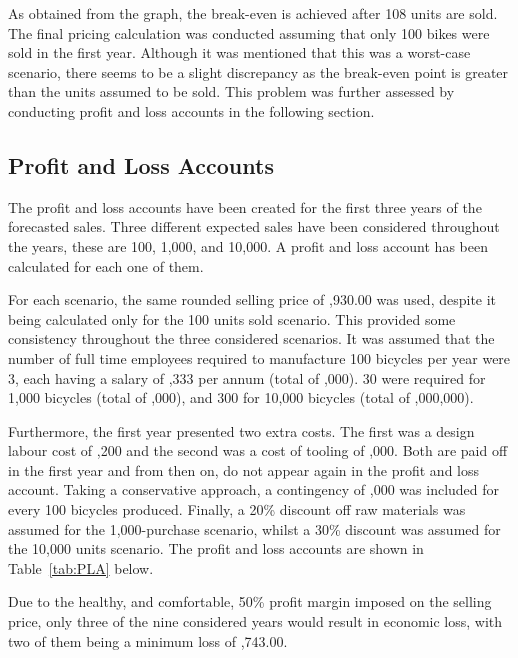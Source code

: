 \documentclass[a4paper,11pt]{article}
\begin{document}
As obtained from the graph, the break-even is achieved after 108 units are sold. The final pricing calculation was conducted assuming that only 100 bikes were sold in the first year. Although it was mentioned that this was a worst-case scenario, there seems to be a slight discrepancy as the break-even point is greater than the units assumed to be sold. This problem was further assessed by conducting profit and loss accounts in the following section. 

\subsection{Profit and Loss Accounts}

The profit and loss accounts have been created for the first three years of the forecasted sales. Three different expected sales have been considered throughout the years, these are 100, 1,000, and 10,000. A profit and loss account has been calculated for each one of them. 

For each scenario, the same rounded selling price of ,930.00 was used, despite it being calculated only for the 100 units sold scenario. This provided some consistency throughout the three considered scenarios. It was assumed that the number of full time employees required to manufacture 100 bicycles per year were 3, each having a salary of ,333 per annum (total of ,000). 30 were required for 1,000 bicycles (total of ,000), and 300 for 10,000 bicycles (total of ,000,000). 

Furthermore, the first year presented two extra costs. The first was a design labour cost of ,200 and the second was a cost of tooling of ,000. Both are paid off in the first year and from then on, do not appear again in the profit and loss account. Taking a conservative approach, a contingency of ,000 was included for every 100 bicycles produced. Finally, a 20\% discount off raw materials was assumed for the 1,000-purchase scenario, whilst a 30\% discount was assumed for the 10,000 units scenario. The profit and loss accounts are shown in Table~\ref{tab:PLA} below. 

Due to the healthy, and comfortable, 50\% profit margin imposed on the selling price, only three of the nine considered years would result in economic loss, with two of them being a minimum loss of ,743.00. 
\end{document}
